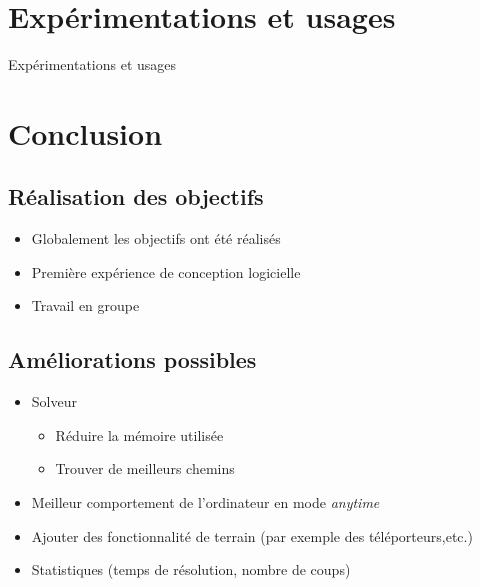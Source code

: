 \documentclass{beamer}
\begin{document}
\section{Expérimentations et usages}
\begin{frame}
Expérimentations et usages
\end{frame}

\section{Conclusion}
\subsection{Réalisation des objectifs}
\begin{frame}
\begin{itemize}
\item Globalement les objectifs ont été réalisés
\item Première expérience de conception logicielle
\item Travail en groupe 
\end{itemize}
\end{frame}

\subsection{Améliorations possibles}
\begin{frame}
\begin{itemize}
\item Solveur
\begin{itemize}
\item Réduire la mémoire utilisée
\item Trouver de meilleurs chemins
\end{itemize}
\item Meilleur comportement de l'ordinateur en mode \textit{anytime}
\item Ajouter des fonctionnalité de terrain (par exemple des téléporteurs,etc.)
\item Statistiques (temps de résolution, nombre de coups)
\end{itemize}
\end{frame}
\end{document}
